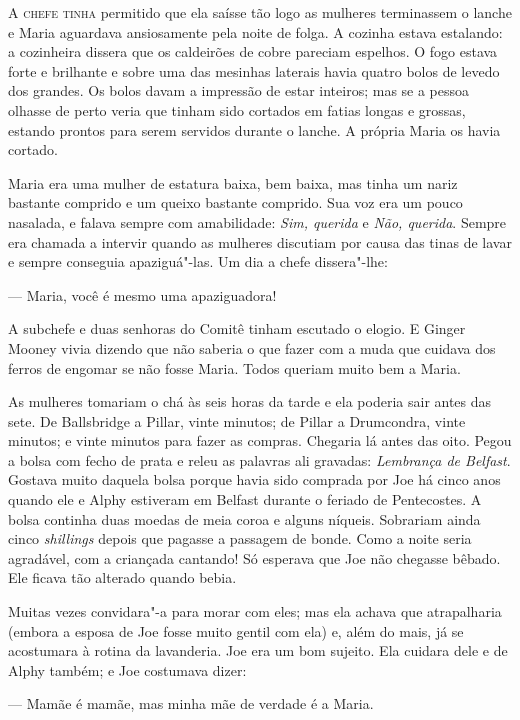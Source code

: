 \textsc{A chefe tinha} permitido que ela saísse tão logo as mulheres
terminassem o lanche e Maria aguardava ansiosamente pela noite de folga.  A
cozinha estava estalando: a cozinheira dissera que os caldeirões de cobre
pareciam espelhos.  O fogo estava forte e brilhante e sobre uma das mesinhas
laterais havia quatro bolos de levedo dos grandes.  Os bolos davam a impressão
de estar inteiros; mas se a pessoa olhasse de perto veria que tinham sido
cortados em fatias longas e grossas, estando prontos para serem servidos
durante o lanche.  A própria Maria os havia cortado.

Maria era uma mulher de estatura baixa, bem baixa, mas tinha um nariz bastante
comprido e um queixo bastante comprido.  Sua voz era um pouco nasalada, e
falava sempre com amabilidade: \textit{Sim, querida} e \textit{Não, querida}.
Sempre era chamada a intervir quando as mulheres discutiam por causa das tinas
de lavar e sempre conseguia apaziguá"-las.  Um dia a chefe dissera"-lhe:

--- Maria, você é mesmo uma apaziguadora!

A subchefe e duas senhoras do Comitê tinham escutado o elogio.  E Ginger Mooney
vivia dizendo que não saberia o que fazer com a muda que cuidava dos ferros de
engomar se não fosse Maria.  Todos queriam muito bem a Maria.

As mulheres tomariam o chá às seis horas da tarde e ela poderia sair antes das
sete.  De Ballsbridge a Pillar, vinte minutos; de Pillar a Drumcondra, vinte
minutos; e vinte minutos para fazer as compras.  Chegaria lá antes das oito.
Pegou a bolsa com fecho de prata e releu as palavras ali gravadas:
\textit{Lembrança de Belfast}.  Gostava muito daquela bolsa porque havia sido
comprada por Joe há cinco anos quando ele e Alphy estiveram em Belfast durante
o feriado de Pentecostes.  A bolsa continha duas moedas de meia coroa e alguns
níqueis.  Sobrariam ainda cinco \textit{shillings} depois que pagasse a
passagem de bonde.  Como a noite seria agradável, com a criançada cantando!  Só
esperava que Joe não chegasse bêbado.  Ele ficava tão alterado quando bebia.

Muitas vezes convidara"-a para morar com eles; mas ela achava que atrapalharia
(embora a esposa de Joe fosse muito gentil com ela) e, além do mais, já se
acostumara à rotina da lavanderia.  Joe era um bom sujeito.  Ela cuidara dele e
de Alphy também; e Joe costumava dizer:

--- Mamãe é mamãe, mas minha mãe de verdade é a Maria.

